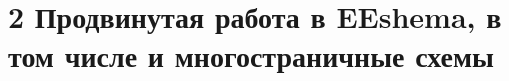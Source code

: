 \chapter{2 Продвинутая работа в EEshema, в том числе и многостраничные схемы}\label{kicad:eeschema-adv}
